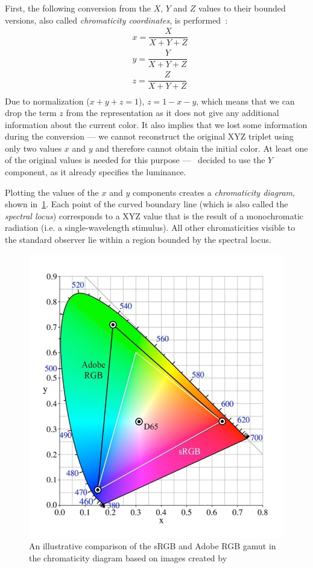 First, the following conversion from the $X$, $Y$ and $Z$ values to their bounded versions, also called \emph{chromaticity coordinates}, is performed~\cite{xyYEquations}:
\begin{equation} \label{XYZtoxyY}
\begin{aligned}
&x=\dfrac{X}{X+Y+Z}\\
&y=\dfrac{Y}{X+Y+Z}\\
&z=\dfrac{Z}{X+Y+Z}\\
\end{aligned}
\end{equation}
Due to normalization ($x+y+z=1$), $z=1-x-y$, which means that we can drop the term $z$ from the representation as it does not give any additional information about the current color. It also implies that we lost some information during the conversion --- we cannot reconstruct the original XYZ triplet using only two values $x$ and $y$ and therefore cannot obtain the initial color. At least one of the original values is needed for this purpose ---~\citet{CIE} decided to use the $Y$ component, as it already specifies the luminance.

Plotting the values of the $x$ and $y$ components creates a \emph{chromaticity diagram}, shown in~\cref{fig:chromaticityDiagram}. Each point of the curved boundary line (which is also called the \emph{spectral locus}) corresponds to a XYZ value that is the result of a monochromatic radiation (i.e. a single-wavelength stimulus). All other chromaticities visible to the standard observer lie within a region bounded by the spectral locus.

\begin{figure}[t!]
	\centering
	\includegraphics[width=0.6\linewidth,height=0.3\textheight]{img/chromaticity_diagram.jpeg}
	\caption{An illustrative comparison of the sRGB and Adobe RGB gamut in the chromaticity diagram based on images created by~\citet{chromaticityDiagramResource}}
	\label{fig:chromaticityDiagram}
\end{figure}


